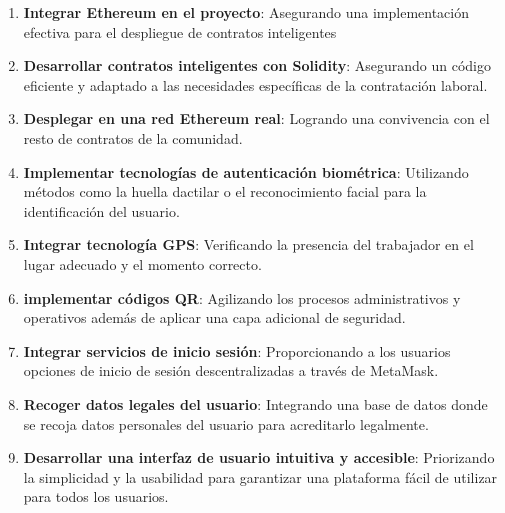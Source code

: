 \begin{enumerate}

\item \textbf{Integrar Ethereum en el proyecto}: Asegurando una implementación efectiva para el despliegue de contratos inteligentes

\item \textbf{Desarrollar contratos inteligentes con Solidity}: Asegurando un código eficiente y adaptado a las necesidades específicas de la contratación laboral. 

\item \textbf{Desplegar en una red Ethereum real}: Logrando una convivencia con el resto de contratos de la comunidad.

\item \textbf{Implementar tecnologías de autenticación biométrica}: Utilizando métodos como la huella dactilar o el reconocimiento facial para la identificación del usuario.

\item \textbf{Integrar tecnología GPS}: Verificando la presencia del trabajador en el lugar adecuado y el momento correcto.

\item \textbf{implementar códigos QR}: Agilizando los procesos administrativos y operativos además de aplicar una capa adicional de seguridad.

\item \textbf{Integrar servicios de inicio sesión}: Proporcionando a los usuarios opciones de inicio de sesión descentralizadas a través de MetaMask.


\item \textbf{Recoger datos legales del usuario}: Integrando una base de datos donde se recoja datos personales del usuario para acreditarlo legalmente.

\item \textbf{Desarrollar una interfaz de usuario intuitiva y accesible}: Priorizando la simplicidad y la usabilidad para garantizar una plataforma fácil de utilizar para todos los usuarios.



\end{enumerate}